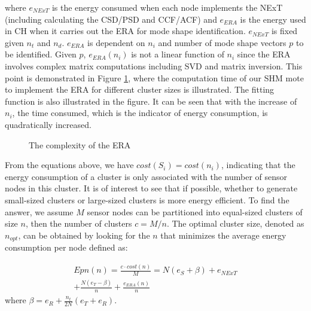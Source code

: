 where \(e_{NExT}\) is the energy consumed when each node implements the NExT (including calculating the CSD/PSD and CCF/ACF) and \(e_{ERA}\) is the energy used in CH when it carries out the ERA for mode shape identification. \(e_{NExT}\) is fixed given  \(n_t\) and \(n_d\). \(e_{ERA}\) is dependent on \(n_i\) and number of mode shape vectors \(p\) to be identified.  Given \(p\), \(e_{ERA}(n_i)\) is not a linear function of \(n_i\) since the ERA involves complex matrix computations including SVD and matrix inversion. This point is demonstrated in Figure \ref{fig:ERAcomplexity}, where the computation time of our SHM mote to implement the ERA for different cluster sizes is illustrated. The fitting function is also illustrated in the figure. It can be seen that with the increase of \(n_i\), the time consumed, which is the indicator of energy consumption, is quadratically increased.
\begin{figure}
	\centering
	\caption{The complexity of the ERA}
	\label{fig:ERAcomplexity}
\end{figure}

From the equations above, we have \(cost(S_i)=cost(n_i)\), indicating that the energy consumption of a cluster is only associated with the number of sensor nodes in this cluster. It is of interest to see that if possible, whether to generate small-sized clusters or large-sized clusters is more energy efficient.  To find the answer, we assume \(M\) sensor nodes can be partitioned into equal-sized clusters of size \(n\), then the number of clusters \(c = M/n\). The optimal cluster size, denoted as \(n_{opt}\), can be obtained by looking for the \(n\) that minimizes the average energy consumption per node defined as: 

\begin{align}
\label{eq:nooverlap}
Epn(n) = \frac{c\cdot cost(n)}{M} = N(e_S+\beta) + e_{NExT}\\ \nonumber 
+ \frac{N(e_T-\beta)}{n} + \frac{e_{ERA}(n)}{n} 
\end{align}
where \(\beta =e_R+\frac{n_t}{2N}(e_T+e_R)\).


